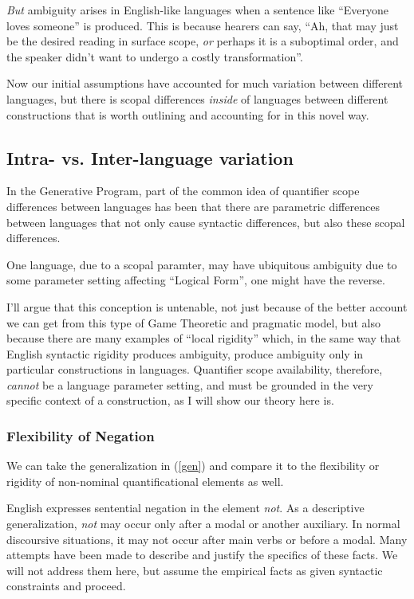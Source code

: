\documentclass{article}
\begin{document}
\emph{But} ambiguity arises in English-like languages when a sentence like ``Everyone loves someone'' is produced.
This is because hearers can say, ``Ah, that may just be the desired reading in surface scope, \emph{or} perhaps it is a suboptimal order, and the speaker didn't want to undergo a costly transformation''.

Now our initial assumptions have accounted for much variation between different languages, but there is scopal differences \emph{inside} of languages between different constructions that is worth outlining and accounting for in this novel way.

\subsection{Intra- vs. Inter-language variation}

In the Generative Program, part of the common idea of quantifier scope differences between languages has been that there are parametric differences between languages that not only cause syntactic differences, but also these scopal differences.

One language, due to a scopal paramter, may have ubiquitous ambiguity due to some parameter setting affecting ``Logical Form'', one might have the reverse.

I'll argue that this conception is untenable, not just because of the better account we can get from this type of Game Theoretic and pragmatic model, but also because there are many examples of ``local rigidity'' which, in the same way that English syntactic rigidity produces ambiguity, produce ambiguity only in particular constructions in languages.
Quantifier scope availability, therefore, \emph{cannot} be a language parameter setting, and must be grounded in the very specific context of a construction, as I will show our theory here is.

\subsubsection{Flexibility of Negation}

We can take the generalization in (\ref{gen}) and compare it to the flexibility or rigidity of non-nominal quantificational elements as well.

English expresses sentential negation in the element \emph{not}. As a descriptive generalization, \emph{not} may occur only after a modal or another auxiliary. In normal discoursive situations, it may not occur after main verbs or before a modal. Many attempts have been made to describe and justify the specifics of these facts. We will not address them here, but assume the empirical facts as given syntactic constraints and proceed.
\end{document}
